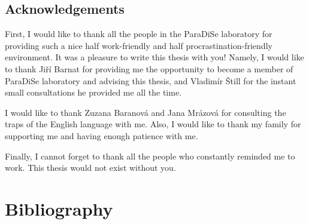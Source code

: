 \documentclass[11pt,twoside,a4paper]{book}
\begin{document}
\cleardoublepage

\section*{Acknowledgements}
First, I would like to thank all the people in the ParaDiSe laboratory for
providing such a nice half work-friendly and half procrastination-friendly
environment. It was a pleasure to write this thesis with you! Namely, I would
like to thank Jiří Barnat for providing me the opportunity to become a member of
ParaDiSe laboratory and advising this thesis, and Vladimír Štill for the instant
small consultations he provided me all the time.

I would like to thank Zuzana Baranová and Jana Mrázová for consulting the traps
of the English language with me. Also, I would like to thank my family for
supporting me and having enough patience with me.

Finally, I cannot forget to thank all the people who constantly reminded me to
work. This thesis would not exist without you.


\cleardoublepage
\thispagestyle{empty}

\pagestyle{headings}
\tableofcontents
\mainmatter








\chapter*{Bibliography}
\markboth{}{} %
\printbibliography[heading=none]

\appendix


\end{document}
